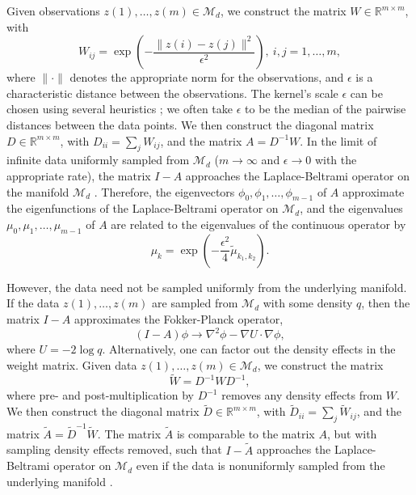 \documentclass[preprint]{elsarticle}
\begin{document}
Given observations $z(1), \dots, z(m) \in \mathcal{M}_d$, we construct the matrix $W \in \mathbb{R}^{m \times m}$, with
\begin{equation} \label{eq:W}
W_{ij} = \exp \left( -\frac{\|z(i) - z(j) \|^2}{\epsilon^2} \right), \ i,j=1,\ldots,m,
\end{equation}
where $\| \cdot \|$ denotes the appropriate norm for the observations, and $\epsilon$ is a characteristic distance between the observations. 
%
The kernel's scale $\epsilon$ can be chosen using several heuristics \cite{coifman2008graph, rohrdanz2011determination}; we often take $\epsilon$ to be the median of the pairwise distances between the data points.
%
We then construct the diagonal matrix $D \in \mathbb{R}^{m \times m}$, with $D_{ii} = \sum_j W_{ij}$, and the matrix $A  = D^{-1} W.$
%
In the limit of infinite data uniformly sampled from $\mathcal{M}_d$ ($m \rightarrow \infty$ and $\epsilon \rightarrow 0$ with the appropriate rate), the matrix $I-A$ approaches the Laplace-Beltrami operator on the manifold $\mathcal{M}_d$ \cite{coifman2006geometric}. 
%
Therefore, the eigenvectors $\phi_0, \phi_1, \dots, \phi_{m-1}$ of $A$ approximate the eigenfunctions of the Laplace-Beltrami operator on $\mathcal{M}_d$,
and the eigenvalues $\mu_0, \mu_1, \dots, \mu_{m-1}$ of $A$ are related to the eigenvalues of the continuous operator by 
\begin{equation} \label{eq:evals_relationship}
\mu_k = \exp \left( -\frac{\epsilon^2}{4} \tilde{\mu}_{k_1, k_2}  \right).
\end{equation}
%

However, the data need not be sampled uniformly from the underlying manifold.
%
If the data $z(1), \dots, z(m)$ are sampled from $\mathcal{M}_d$ with some density $q$, then the matrix $I-A$ approximates the Fokker-Planck operator, 
\begin{equation}
(I-A) \phi \rightarrow \nabla^2 \phi - \nabla U \cdot \nabla \phi, 
\end{equation}
where $U = -2 \log q$. 
%
Alternatively, one can factor out the density effects in the weight matrix.
%
Given data $z(1), \dots, z(m) \in \mathcal{M}_d$, we construct the matrix
%
\begin{equation}
\tilde{W} = D^{-1} W D^{-1},
\end{equation}
%
where pre- and post-multiplication by $D^{-1}$ removes any density effects from $W$. 
%
We then construct the diagonal matrix $\tilde{D} \in \mathbb{R}^{m \times m}$, with $\tilde{D}_{ii} = \sum_j \tilde{W}_{ij}$, and the matrix $\tilde{A}  = \tilde{D}^{-1} \tilde{W}.$
%
The matrix $\tilde{A}$ is comparable to the matrix $A$, but with sampling density effects removed, such that $I-\tilde{A}$ approaches the Laplace-Beltrami operator on $\mathcal{M}_d$ even if the data is nonuniformly sampled from the underlying manifold \cite{coifman2005geometric}. 
\end{document}
